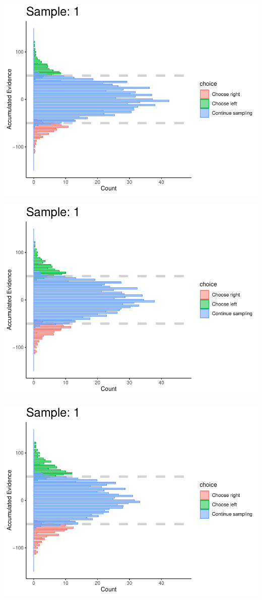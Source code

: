 \documentclass[
]{book}
\begin{document}
\begin{center}\includegraphics[width=0.8\linewidth]{LateNightBayes_files/figure-latex/fixed_check-7} \end{center}

\begin{center}\includegraphics[width=0.8\linewidth]{LateNightBayes_files/figure-latex/fixed_check-8} \end{center}

\begin{center}\includegraphics[width=0.8\linewidth]{LateNightBayes_files/figure-latex/fixed_check-9} \end{center}
\end{document}
